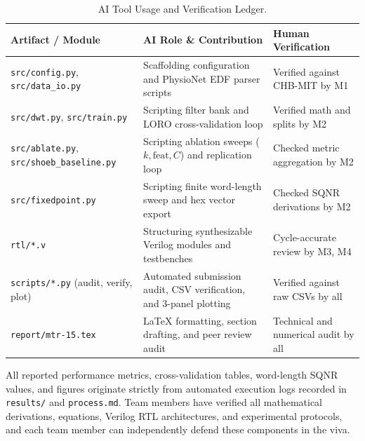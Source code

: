 \documentclass[10pt,twocolumn,letterpaper]{article}
\begin{document}
\begin{table}[h]
\centering
\footnotesize
\setlength{\tabcolsep}{4pt}
\caption{AI Tool Usage and Verification Ledger.}
\label{tab:ai_ledger}
\begin{tabularx}{\textwidth}{@{}p{4.5cm}Xp{4.6cm}@{}}
\toprule
\textbf{Artifact / Module} & \textbf{AI Role \& Contribution} & \textbf{Human Verification} \\
\midrule
\texttt{src/config.py}, \texttt{src/data\_io.py} & Scaffolding configuration and PhysioNet EDF parser scripts & Verified against CHB-MIT by M1 \\
\texttt{src/dwt.py}, \texttt{src/train.py} & Scripting filter bank and LORO cross-validation loop & Verified math and splits by M2 \\
\texttt{src/ablate.py}, \texttt{src/shoeb\_baseline.py} & Scripting ablation sweeps ($k, \text{feat}, C$) and replication loop & Checked metric aggregation by M2 \\
\texttt{src/fixedpoint.py} & Scripting finite word-length sweep and hex vector export & Checked SQNR derivations by M2 \\
\texttt{rtl/*.v} & Structuring synthesizable Verilog modules and testbenches & Cycle-accurate review by M3, M4 \\
\texttt{scripts/*.py} (audit, verify, plot) & Automated submission audit, CSV verification, and 3-panel plotting & Verified against raw CSVs by all \\
\texttt{report/mtr-15.tex} & LaTeX formatting, section drafting, and peer review audit & Technical and numerical audit by all \\
\bottomrule
\end{tabularx}
\end{table}

All reported performance metrics, cross-validation tables, word-length SQNR values, and figures originate strictly from automated execution logs recorded in \texttt{results/} and \texttt{process.md}. Team members have verified all mathematical derivations, equations, Verilog RTL architectures, and experimental protocols, and each team member can independently defend these components in the viva.

{\small


}
\end{document}
